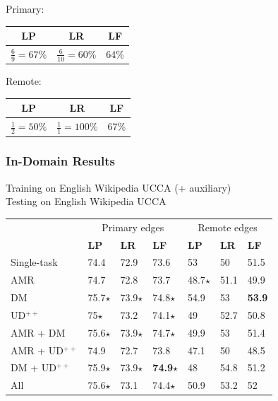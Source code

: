 \documentclass[t,xcolor={svgnames}]{beamer}
\begin{document}
\begin{frame}
\begin{adjustbox}{frame,scale=.75,center}
\begin{tikzpicture}[level distance=15mm, sibling distance=15mm, ->,
	    every circle node/.append style={fill=black}]
	\end{tikzpicture}
\end{adjustbox}
\vfill
\begin{adjustbox}{scale=.75,center}
	Primary:
	\begin{tabular}{ccc}
		\textbf{LP} & \textbf{LR} & \textbf{LF} \\ \hline
		$\frac69=67\%$ & $\frac6{10}=60\%$ & 64\%
	\end{tabular}
	\hspace{1cm}
	Remote:
	\begin{tabular}{ccc}
		\textbf{LP} & \textbf{LR} & \textbf{LF} \\ \hline
		$\frac12=50\%$ & $\frac11=100\%$ & 67\%
	\end{tabular}
\end{adjustbox}
\end{frame}

\begin{frame}
\frametitle{In-Domain Results}
Training on English Wikipedia UCCA (+ auxiliary) \\ Testing on English Wikipedia UCCA
\begin{center}
	\begin{tabular}{l|lll|lll}
	& \multicolumn{3}{c|}{Primary edges} & \multicolumn{3}{c}{Remote edges} \\
	& \textbf{LP} & \textbf{LR} & \textbf{LF}
	& \textbf{LP} & \textbf{LR} & \textbf{LF} \\
	\hline
	Single-task
	& 74.4 & 72.9 & 73.6 & 53 & 50 & 51.5 \\
	\cline{1-1}
	AMR
	& 74.7 & 72.8 & 73.7 & 48.7$\star$ & 51.1 & 49.9 \\
	DM
	& 75.7$\star$ & 73.9$\star$ & 74.8$\star$ & 54.9 & 53 & \textbf{53.9} \\
	UD$^{++}$
	& 75$\star$ & 73.2 & 74.1$\star$ & 49 & 52.7 & 50.8 \\
	AMR + DM
	& 75.6$\star$ & 73.9$\star$ & 74.7$\star$ & 49.9 & 53 & 51.4 \\
	AMR + UD$^{++}$
	& 74.9 & 72.7 & 73.8 & 47.1 & 50 & 48.5 \\
	DM + UD$^{++}$
	& 75.9$\star$ & 73.9$\star$ & \textbf{74.9}$\star$ & 48 & 54.8 & 51.2 \\
	All
	& 75.6$\star$ & 73.1 & 74.4$\star$ & 50.9 & 53.2 & 52
	\end{tabular}
\end{center}
\end{frame}
\end{document}
